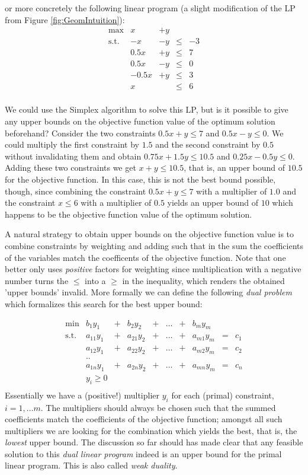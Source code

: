 \documentclass{article}
\begin{document}
or more concretely the following linear program (a slight modification of the LP from Figure \ref{fig:GeomIntuition}):
\[
\begin{matrix}
	\max		& x	&+	y	&&\\ 
	\mbox{s.t.}	&-x	&	-y	&\leq&-3\\ 
			&0.5x	&	+y	&\leq&7\\ 
			&0.5x	&	-y	& \leq&0\\
			&-0.5x	&	+y	& \leq&3\\
			&	x	&		& \leq&6\\
\end{matrix}
\]

We could use the Simplex algorithm to solve this LP, but is it possible to give any upper bounds on the objective function value of the optimum solution beforehand?
Consider the two constraints $0.5x+y\leq 7$ and $0.5x-y\leq 0$. We could multiply the first constraint
by $1.5$ and the second constraint by $0.5$ without invalidating them and obtain $0.75x+1.5y\leq 10.5$ and $0.25x-0.5y\leq 0$. Adding these two constraints we get $x+y\leq 10.5$, that is, an upper bound of $10.5$ for the objective function. In this case, this is not the best bound possible, though, since combining
the constraint $0.5x+y\leq 7$ with a multiplier of $1.0$ and the constraint $x\leq 6$ with a multiplier of $0.5$ yields an upper bound of $10$ which happens to be the objective function value of the optimum solution.

A natural strategy to obtain upper bounds on the objective function value is to combine constraints by weighting and adding such that in the sum the coefficients of the variables match the coefficents of the objective function. Note that one better only uses \emph{positive} factors for weighting since multiplication with a negative number turns the $\leq$ into a $\geq$ in the inequality, which renders the obtained 'upper bounds' invalid. More formally we can define the following \emph{dual problem} which formalizes this search for the best upper bound:

\[
\begin{matrix}
	\min& b_1 y_1 &+& b_2 y_2 &+& \dots &+& b_m y_m&&\\  
	\mbox{s.t.}	& a_{11} y_1 &+& a_{21} y_2&+& \dots &+&a_{m1} y_m&=&c_1\\
			& a_{12} y_1 &+& a_{22} y_2&+& \dots &+&a_{m2} y_m&=&c_2\\
			& ..	&&&&&&&&\\
			& a_{1n} y_1 &+& a_{2n} y_2&+& \dots &+&a_{mn} y_m&=&c_n\\
			& y_i\geq 0\\
\end{matrix}
\]
Essentially we have a (positive!) multiplier $y_i$ for each (primal) constraint, $i=1,\dots m$. The multipliers should always be chosen such that the summed coefficients match the coefficients of the objective function; amongst all such multipliers we are looking for the combination which yields the best, that is, the \emph{lowest} upper bound. The discussion so far should has made clear that any feasible solution to this \emph{dual linear program} indeed is an upper bound for the primal linear program. This is also called \emph{weak duality}.
\end{document}
